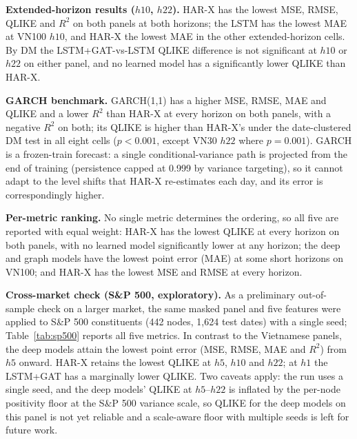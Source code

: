 \documentclass[runningheads]{llncs}
\begin{document}
\textbf{Extended-horizon results ($h10$, $h22$).} HAR-X has the lowest MSE, RMSE, QLIKE and $R^2$ on both
panels at both horizons; the LSTM has the lowest MAE at VN100 $h10$, and HAR-X the lowest MAE in the other
extended-horizon cells. By DM the LSTM+GAT-vs-LSTM QLIKE difference is not significant at $h10$ or $h22$ on
either panel, and no learned model has a significantly lower QLIKE than HAR-X.

\textbf{GARCH benchmark.} GARCH(1,1) has a higher MSE, RMSE, MAE and QLIKE and a lower $R^2$ than HAR-X at
every horizon on both panels, with a negative $R^2$ on both; its QLIKE is higher than HAR-X's under the
date-clustered DM test in all eight cells ($p<0.001$, except VN30 $h22$ where $p=0.001$). GARCH is a frozen-train forecast: a single conditional-variance path is projected from the end of training (persistence capped at 0.999 by variance targeting), so it cannot adapt to the level shifts that HAR-X re-estimates each day, and its error is correspondingly higher.

\textbf{Per-metric ranking.} No single metric determines the ordering, so all five are reported with equal
weight: HAR-X has the lowest QLIKE at every horizon on both panels, with no learned model significantly lower
at any horizon; the deep and graph models have the lowest point error (MAE) at some short horizons on VN100;
and HAR-X has the lowest MSE and RMSE at every horizon.

\textbf{Cross-market check (S\&P 500, exploratory).} As a preliminary out-of-sample check on a larger market, the same masked panel and five features were applied to S\&P 500 constituents (442 nodes, 1{,}624 test dates) with a single seed; Table~\ref{tab:sp500} reports all five metrics. In contrast to the Vietnamese panels, the deep models attain the lowest point error (MSE, RMSE, MAE and $R^2$) from $h5$ onward. HAR-X retains the lowest QLIKE at $h5$, $h10$ and $h22$; at $h1$ the LSTM+GAT has a marginally lower QLIKE. Two caveats apply: the run uses a single seed, and the deep models' QLIKE at $h5$--$h22$ is inflated by the per-node positivity floor at the S\&P 500 variance scale, so QLIKE for the deep models on this panel is not yet reliable and a scale-aware floor with multiple seeds is left for future work.
\end{document}
